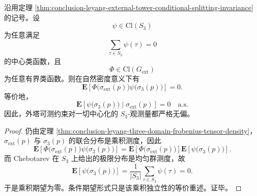 \begin{corollary}\label{cor:conclusion-leyang-external-tower-centered-classfunction-unbiasedness}
沿用定理 \ref{thm:conclusion-leyang-external-tower-conditional-splitting-invariance} 的记号。设
\[
\psi\in \mathrm{Cl}(S_3)
\]
为任意满足
\[
\sum_{\tau\in S_3}\psi(\tau)=0
\]
的中心类函数，且
\[
\Phi\in \mathrm{Cl}(G_{\mathrm{ext}})
\]
为任意有界类函数。则在自然密度意义下有
\[
\mathbf E\!\left[\Phi\bigl(\sigma_{\mathrm{ext}}(p)\bigr)\psi\bigl(\sigma_3(p)\bigr)\right]=0.
\]
等价地，
\[
\mathbf E\!\left[\psi\bigl(\sigma_3(p)\bigr)\mid \sigma_{\mathrm{ext}}(p)\right]=0
\quad\text{a.s.}
\]
因此，外塔可测约束对一切中心化的 \(S_3\)-观测量都严格无偏。
\end{corollary}
\begin{proof}
仍由定理 \ref{thm:conclusion-leyang-three-domain-frobenius-tensor-density}，\(\sigma_{\mathrm{ext}}(p)\) 与 \(\sigma_3(p)\) 的联合分布是乘积测度，因此
\[
\mathbf E\!\left[\Phi\bigl(\sigma_{\mathrm{ext}}(p)\bigr)\psi\bigl(\sigma_3(p)\bigr)\right]
=
\mathbf E\!\left[\Phi\bigl(\sigma_{\mathrm{ext}}(p)\bigr)\right]
\mathbf E\!\left[\psi\bigl(\sigma_3(p)\bigr)\right].
\]
而 Chebotarev 在 \(S_3\) 上给出的极限分布是均匀群测度，故
\[
\mathbf E\!\left[\psi\bigl(\sigma_3(p)\bigr)\right]
=
\frac1{|S_3|}\sum_{\tau\in S_3}\psi(\tau)=0.
\]
于是乘积期望为零。条件期望形式只是该乘积独立性的等价重述。证毕。
\end{proof}

